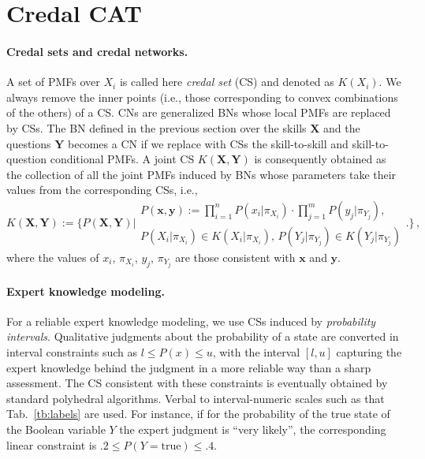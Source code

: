 \documentclass[runningheads]{llncs}
\begin{document}
	\section{Credal CAT}
	
	\paragraph{Credal sets and credal networks.} A set of PMFs over $X_i$ is called here 
	\emph{credal set} (CS) and denoted as $K(X_i)$. We always remove the inner points 
	(i.e., those corresponding to convex combinations of the others) of a CS. CNs 
	\cite{cozman2000} are generalized BNs whose local PMFs are replaced by CSs.  The BN 
	defined in the previous section over the skills $\bm{X}$ and the questions $\bm{Y}$ 
	becomes a CN if we replace with CSs the skill-to-skill and skill-to-question conditional 
	PMFs. A joint CS $K(\bm{X},\bm{Y})$ is consequently obtained as the collection of all 
	the joint PMFs induced by BNs whose parameters take their values from the 
	corresponding CSs, i.e., 
	\begin{equation}\label{eq:strongext}
		K(\bm{X},\bm{Y}):=\bigl\{ P(\bm{X},\bm{Y}) \bigl| 
		\substack{
			P(\bm{x},\bm{y}):=\prod_{i=1}^n P(x_i|\pi_{X_i}) \cdot \prod_{j=1}^m P(y_j|\pi_{Y_j}), 
			\\P(X_i|\pi_{X_i}) \in K(X_i|\pi_{X_i}) ,\, P(Y_j|\pi_{Y_j}) \in K(Y_j|\pi_{Y_j})}
		\bigr.
		\bigr\}\,,
	\end{equation}
	where the values of $x_i$, $\pi_{X_i}$, $y_j$, $\pi_{Y_j}$ are those consistent with 
	$\bm{x}$ and $\bm{y}$.
	
	\paragraph{Expert knowledge modeling.} For a reliable expert knowledge modeling, 
	we use CSs induced by \emph{probability intervals}. Qualitative judgments about the 
	probability of a state are converted in interval constraints such as $l\leq P(x) \leq u$, 
	with the interval $[l,u]$ capturing the expert knowledge behind the judgment in a more 
	reliable way than a sharp assessment. The CS consistent with these constraints is 
	eventually obtained by standard polyhedral algorithms. Verbal to interval-numeric 
	scales such as that Tab.~\ref{tb:labels} are used. For instance, if for the probability of 
	the true state of the Boolean variable $Y$ the expert judgment is ``very likely'', the 
	corresponding linear constraint is $.2 \leq P(Y=\textrm{true}) \leq .4$.%
	
\end{document}
